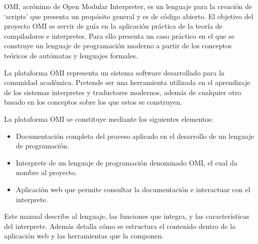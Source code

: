 OMI, acrónimo de Open Modular Interpreter, es un lenguaje para la creación de `scripts' que presenta un propósito general y es de código abierto.
El objetivo del proyecto OMI es servir de guía en la aplicación práctica de la teoría de compiladores e interpretes. Para ello presenta un caso práctico 
en el que se construye un lenguaje de programación moderno a partir de los conceptos teóricos de autómatas y lenguajes formales. 

La plataforma OMI representa un sistema software desarrollado para la comunidad académica. Pretende ser una herramienta utilizada en el aprendizaje de
los sistemas interpretes y traductores modernos, además de cualquier otro basado en los conceptos sobre los que estos se construyen. 

La plataforma OMI se constituye mediante los siguientes elementos:

\begin{itemize}
   \item Documentación completa del proceso aplicado en el desarrollo de un lenguaje de programación.
   \item Interprete de un lenguaje de programación denominado OMI, el cual da nombre al proyecto.
   \item Aplicación web que permite consultar la documentación e interactuar con el interprete. 
\end{itemize}

Este manual describe al lenguaje, las funciones que integra, y las características del interprete. Además detalla cómo se 
estructura el contenido dentro de la aplicación web y las herramientas que la componen.


